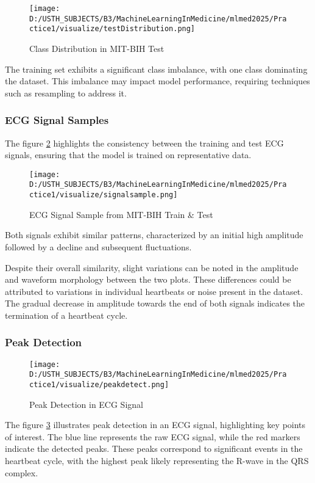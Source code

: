 \documentclass[10pt, conference]{IEEEtran}
\begin{document}
	\begin{figure}[H]
		\centering
		\texttt{[image: D:/USTH\_SUBJECTS/B3/MachineLearningInMedicine/mlmed2025/Practice1/visualize/testDistribution.png]}
		\caption{Class Distribution in MIT-BIH Test}
		\label{fig:test_dist}
	\end{figure}
	
	The training set exhibits a significant class imbalance, with one class dominating the dataset. This imbalance may impact model performance, requiring techniques such as resampling to address it.
	
	\subsubsection{ECG Signal Samples}
	The figure \ref{fig:signal_samples} highlights the consistency between the training and test ECG signals, ensuring that the model is trained on representative data.
	
	\begin{figure}[H]
		\centering
		\texttt{[image: D:/USTH\_SUBJECTS/B3/MachineLearningInMedicine/mlmed2025/Practice1/visualize/signalsample.png]}
		\caption{ECG Signal Sample from MIT-BIH Train \& Test}
		\label{fig:signal_samples}
	\end{figure}
	
	Both signals exhibit similar patterns, characterized by an initial high amplitude followed by a decline and subsequent fluctuations.
	
	Despite their overall similarity, slight variations can be noted in the amplitude and waveform morphology between the two plots. These differences could be attributed to variations in individual heartbeats or noise present in the dataset. The gradual decrease in amplitude towards the end of both signals indicates the termination of a heartbeat cycle.
	
	\subsubsection{Peak Detection}
	\begin{figure}[H]
		\centering
		\texttt{[image: D:/USTH\_SUBJECTS/B3/MachineLearningInMedicine/mlmed2025/Practice1/visualize/peakdetect.png]}
		\caption{Peak Detection in ECG Signal}
		\label{fig:peak_detect}
	\end{figure}
	
	The figure \ref{fig:peak_detect} illustrates peak detection in an ECG signal, highlighting key points of interest. The blue line represents the raw ECG signal, while the red markers indicate the detected peaks. These peaks correspond to significant events in the heartbeat cycle, with the highest peak likely representing the R-wave in the QRS complex.
	
\end{document}
